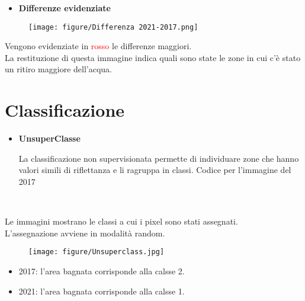 \documentclass[10pt]{beamer}
\begin{document}
\begin{frame} 
    \begin{itemize}
      \item \textbf{Differenze evidenziate}
    \end{itemize}
    \begin{figure}
      \centering
      \texttt{[image: figure/Differenza 2021-2017.png]}
    \end{figure}
    \begin{center}
      {\large Vengono evidenziate in \textcolor{red}{rosso} le differenze maggiori.
      \\La restituzione di questa immagine indica quali sono state le zone in cui c'è stato un ritiro maggiore dell'acqua.\par}
    \end{center}
\end{frame}


\section{Classificazione}
\begin{frame} 
    \begin{itemize}
      \item \textbf{UnsuperClasse}
            \\{\scriptsize La classificazione non supervisionata permette di individuare zone che hanno valori simili di riflettanza e li ragruppa in classi. Codice per l'immagine del 2017\par}
    \begin{mybox}
      \tiny
    \end{mybox}
    \end{itemize}
\end{frame}


\begin{frame} {}
     \centering
     \\{Le immagini mostrano le classi a cui i pixel sono stati assegnati. 
     \\L'assegnazione avviene in modalità random.\par}
   \begin{figure}
      \centering
      \texttt{[image: figure/Unsuperclass.jpg]}
    \end{figure}
    \begin{itemize}
      \centering
         \item 2017: l'area bagnata corrisponde alla calsse 2.
         \item 2021: l'area bagnata corrisponde alla calsse 1.
    \end{itemize}
\end{frame}
 
\end{document}
